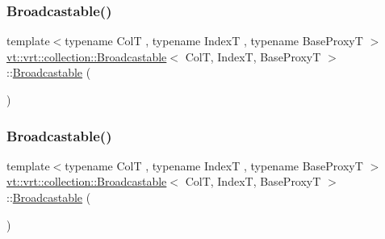 \subsubsection{\texorpdfstring{Broadcastable()}{Broadcastable()}\hspace{0.1cm}{\footnotesize\ttfamily [1/4]}}
{\footnotesize\ttfamily template$<$typename ColT , typename IndexT , typename Base\+ProxyT $>$ \\
\hyperlink{structvt_1_1vrt_1_1collection_1_1_broadcastable}{vt\+::vrt\+::collection\+::\+Broadcastable}$<$ ColT, IndexT, Base\+ProxyT $>$\+::\hyperlink{structvt_1_1vrt_1_1collection_1_1_broadcastable}{Broadcastable} (\begin{DoxyParamCaption}{ }\end{DoxyParamCaption})\hspace{0.3cm}{\ttfamily [default]}}

\mbox{\label{structvt_1_1vrt_1_1collection_1_1_broadcastable_ae8d8b03ad2ab2d9c74a3c2b4537ff806}} 
\subsubsection{\texorpdfstring{Broadcastable()}{Broadcastable()}\hspace{0.1cm}{\footnotesize\ttfamily [2/4]}}
{\footnotesize\ttfamily template$<$typename ColT , typename IndexT , typename Base\+ProxyT $>$ \\
\hyperlink{structvt_1_1vrt_1_1collection_1_1_broadcastable}{vt\+::vrt\+::collection\+::\+Broadcastable}$<$ ColT, IndexT, Base\+ProxyT $>$\+::\hyperlink{structvt_1_1vrt_1_1collection_1_1_broadcastable}{Broadcastable} (\begin{DoxyParamCaption}\item[{\hyperlink{structvt_1_1vrt_1_1collection_1_1_broadcastable}{Broadcastable}$<$ ColT, IndexT, Base\+ProxyT $>$ const \&}]{ }\end{DoxyParamCaption})\hspace{0.3cm}{\ttfamily [default]}}

\mbox{\label{structvt_1_1vrt_1_1collection_1_1_broadcastable_ae2095333f93c2448ee62b0dd7edcebd0}} 
